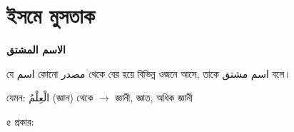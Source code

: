 \newpage

\section{ইসমে মুসতাক}

\begin{center}
  {\arabicfont \color{titlegreen} \textbf{\textarabic{الاسم المشتق}}}
\end{center}

\noindent যে {\arabicfont \textarabic{اسم}} কোনো {\arabicfont \textarabic{مصدر}}
থেকে বের হয়ে বিভিন্ন ওজনে আসে, তাকে {\arabicfont \textarabic{اسم مشتق}} বলে।

\begin{center}
  যেমন: {\arabicfont \textarabic{الْعِلْمُ}} (জ্ঞান) থেকে
  $\rightarrow$
  {\arabicfont {}} জ্ঞানী,
  \enspace
  {\arabicfont {}} জ্ঞাত,
  \enspace
  {\arabicfont {}} অধিক জ্ঞানী
\end{center}

 ৫ প্রকার:

\vspace{0.2cm}

\begingroup
\renewcommand{\tabularxcolumn}[1]{m{#1}}
\setlength{\arrayrulewidth}{0.5pt}
\setlength{\tabcolsep}{3pt}
\renewcommand{\arraystretch}{1.6}

